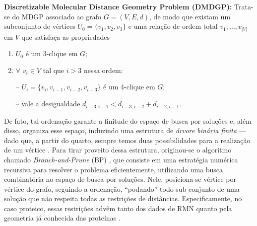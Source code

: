 \documentclass[a4,11pt]{pssbmac}
\begin{document}
	\vspace{0.15cm}
	\textbf{Discretizable Molecular Distance Geometry Problem (DMDGP): } Trata-se do MDGP associado ao grafo $G = (V,E,d)$, de modo que existam um subconjunto de vértices $U_{0} = \{v_{1},v_{2},v_{3} \}$ e uma relação de ordem total $v_1, \dots, v_{|V|}$ em $V$ que satisfaça as propriedades
	\begin{enumerate}
		\item $U_{0}$ é um 3-clique em $G$;
		\vspace{-0.6cm}
		\item 
		\begin{minipage}{0.4\linewidth}  
			$\forall$ $v_{i} \in V$ tal que $i > 3$ nessa ordem:
		\end{minipage}
		\begin{minipage}{0.6\linewidth}
			\vspace{0.6cm}
			-- $U_{i} = \{v_i, v_{i-1}, v_{i-2}, v_{i-3}\}$ é um 4-clique em $G$;
			\vspace{0.2cm}
			
			-- vale a desigualdade $d_{i-3,i-1} < d_{i-3,i-2} + d_{i-2,i-1}$.
		\end{minipage}
	\end{enumerate}
	\vspace{-0.09cm}
	
	De fato, tal ordenação garante a finitude do espaço de busca por soluções \cite{carlileGDandAplications} e, além disso, organiza esse espaço, induzindo uma estrutura de \textit{árvore binária finita} --- dado que, a partir do quarto, sempre temos duas possibilidades para a realização de um vértice \cite{carlileGDandAplications}. Para tirar proveito dessa estrutura, originou-se o algoritmo chamado \textit{Branch-and-Prune} (BP) \cite{carlileDMDGP}, que consiste em uma estratégia numérica recursiva para resolver o problema eficientemente, utilizando uma busca combinatória no espaço de busca por soluções. Nele, posiciona-se vértice por vértice do grafo, seguindo a ordenação, ``podando'' todo sub-conjunto de uma solução que não respeita todas as restrições de distâncias. Especificamente, no caso proteico, essas restrições advêm tanto dos dados de RMN quanto pela geometria já conhecida das proteínas \cite{carlile:MinimalOrder}.
	
\end{document}
